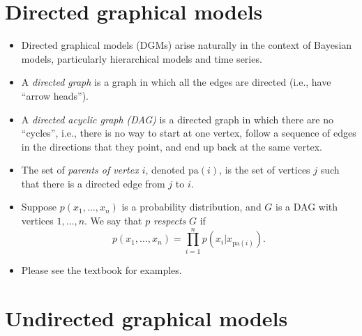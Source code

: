 \documentclass[12pt]{article}
\begin{document}
\section{Directed graphical models}

\begin{itemize}
\item Directed graphical models (DGMs) arise naturally in the context of Bayesian models, particularly hierarchical models and time series.
\item A \textit{directed graph} is a graph in which all the edges are directed (i.e., have ``arrow heads'').
\item A \textit{directed acyclic graph (DAG)} is a directed graph in which there are no ``cycles'', i.e., there is no way to start at one vertex, follow a sequence of edges in the directions that they point, and end up back at the same vertex.
\item The set of \textit{parents of vertex $i$}, denoted $\mathrm{pa}(i)$, is the set of vertices $j$ such that there is a directed edge from $j$ to $i$.
\item Suppose $p(x_1,\ldots,x_n)$ is a probability distribution, and $G$ is a DAG with vertices $1,\ldots,n$. We say that $p$ \textit{respects} $G$ if
$$ p(x_1,\ldots,x_n) = \prod_{i = 1}^n p(x_i | x_{\text{pa}(i)}). $$
\item Please see the textbook for examples.
\end{itemize}

\section{Undirected graphical models}
\end{document}
